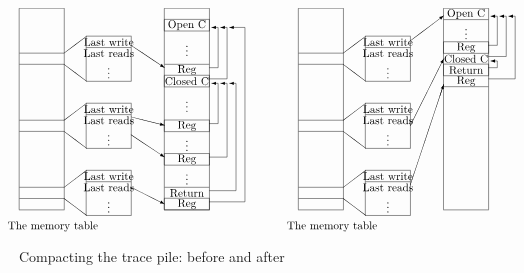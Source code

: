 \documentclass{acm_proc_article-sp}
\begin{document}
\newcommand{\backlink}[3]
{\begin{picture}(#1,#2)
\put(0,0){\line(1,0){#1}}
\put(#1,0){\line(0,1){#2}}
\put(#1,#2){\vector(-1,0){#3}}
\end{picture}}

\newcommand{\rwblock}
{\begin{picture}(100,40)(-40,0)
\put(0,25){\line(4,3){20}}
\put(0,15){\line(4,-3){20}}
\put(-40,25){\line(1,0){40}}
\put(-40,15){\line(1,0){40}}
\put(20,0){\framebox(40,40){\ }}
\put(20,30){\line(1,0){40}}
\put(20,30){\makebox(40,10){Last write}}
\put(20,20){\makebox(40,10){Last reads}}
\put(20,5){\makebox(40,10){\vdots}}
\end{picture}}
\begin{figure*}
\small
\hrulefill
\[
\begin{picture}(250,200)(-30,10)
\put(-30,30){\framebox(40,180)[t]{\ }}
\put(-30,10){\makebox(60,10){The memory table}}
\put(-30,145){\rwblock}
\put(70,177){\vector(3,-2){30}}
\put(-30,85){\rwblock}
\put(70,113){\vector(4,-1){30}}
\put(70,97){\vector(3,-2){30}}
\put(-30,25){\rwblock}
\put(70,50){\vector(2,-1){30}}
\put(100,30){\framebox(40,180)[t]{\ }}
\put(100,190){\framebox(40,10){Open C}}
\put(100,170){\makebox(40,10){\vdots}}
\put(100,160){\line(1,0){40}}
\put(100,150){\makebox(40,10){Reg}}
\put(140,157){\backlink{8}{36}{6}}
\put(100,140){\framebox(40,10){Closed C}}
\put(140,147){\backlink{16}{46}{6}}
\put(100,120){\makebox(40,10){\vdots}}
\put(100,100){\framebox(40,10){Reg}}
\put(140,107){\backlink{8}{36}{6}}
\put(100,85){\makebox(40,10){\vdots}}
\put(100,70){\framebox(40,10){Reg}}
\put(140,77){\backlink{16}{66}{6}}
\put(100,50){\line(1,0){40}}
\put(100,55){\makebox(40,10){\vdots}}
\put(100,40){\makebox(40,10){Return}}
\put(140,47){\backlink{24}{96}{6}}
\put(100,30){\framebox(40,10){Reg}}
\put(140,37){\backlink{32}{156}{14}}
\end{picture}
%
%
\begin{picture}(200,200)(-30,10)
\put(-30,30){\framebox(40,180)[t]{\ }}
\put(-30,10){\makebox(60,10){The memory table}}
\put(-30,145){\rwblock}
\put(70,181){\vector(4,3){30}}
\put(-30,85){\rwblock}
\put(70,105){\vector(1,2){30}}
\put(-30,25){\rwblock}
\put(70,52){\vector(1,3){30}}
\put(100,30){\framebox(40,180)[t]{\ }}
\put(100,200){\makebox(40,10){Open C}}
\put(100,200){\line(1,0){40}}
\put(100,185){\makebox(40,10){\vdots}}
\put(100,170){\framebox(40,10){Reg}}
\put(140,177){\backlink{8}{26}{6}}
\put(100,160){\makebox(40,10){Closed C}}
\put(140,167){\backlink{16}{36}{6}}
\put(100,150){\framebox(40,10){Return}}
\put(140,157){\backlink{8}{6}{6}}
\put(100,140){\makebox(40,10){Reg}}
\put(140,147){\backlink{24}{56}{6}}
\put(100,140){\line(1,0){40}}
\end{picture}
\]
\hrulefill
\caption{Compacting the trace pile: before and after}
\label{fnyembladata}
\end{figure*}
\end{document}
